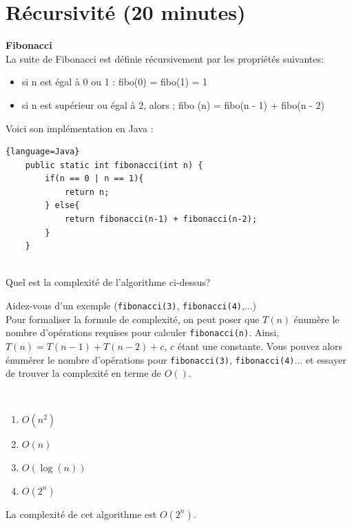\section{Récursivité (20 minutes) }
\begin{Exercice} [5 minutes] \textbf{Fibonacci}\\
\label{exercice:1}
    La suite de Fibonacci est définie récursivement par les propriétés suivantes:
    \begin{itemize}
        \item si n est égal à 0 ou 1 : fibo(0) = fibo(1) = 1
        \item si n est supérieur ou égal à 2, alors ; fibo (n) = fibo(n - 1) + fibo(n - 2)
    \end{itemize}
    
    Voici son implémentation en Java :
    
    \begin{lstlisting}{language=Java}
    public static int fibonacci(int n) {
        if(n == 0 | n == 1){
            return n;
        } else{
            return fibonacci(n-1) + fibonacci(n-2);
        }
    }
            
    \end{lstlisting}
    
    Quel est la complexité de l'algorithme ci-dessus?
    
    \begin{conseil}
    Aidez-vous d'un exemple (\lstinline{fibonacci(3)}, \lstinline{fibonacci(4)},...) \\
    Pour formaliser la formule de complexité, on peut poser que $T(n)$ énumère le nombre d'opérations requises pour calculer \lstinline{fibonacci(n)}. Ainsi, $T(n) = T(n-1) + T(n-2) + c$, $c$ étant une constante. Vous pouvez alors énumérer le nombre d'opérations pour \lstinline{fibonacci(3)}, \lstinline{fibonacci(4)}... et essayer de trouver la complexité en terme de $O()$.
    \end{conseil}
    
    \ \\
    
    \begin{enumerate}
        \item $O(n^2)$
        \item $O(n)$
        \item $O(\log(n))$
        \item $O(2^n)$
    \end{enumerate}
    
    \begin{solution}
        La complexité de cet algorithme est $O(2^n)$.
    \end{solution}
\end{Exercice}

